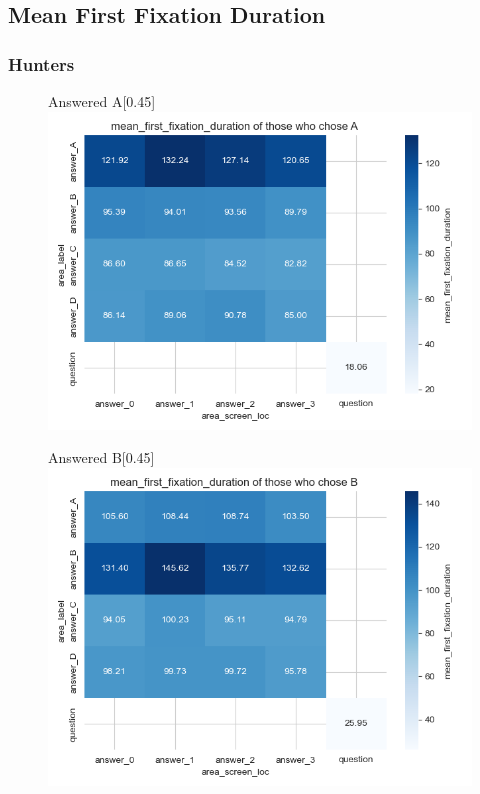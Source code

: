 \documentclass{article}
\begin{document}
\subsection{Mean First Fixation Duration}
\subsubsection{Hunters}

\begin{figure}[H]
  \centering
  \begin{subcaptionbox}{Answered A\label{fig:A_ff_h}}[0.45\textwidth]
    {\centering\includegraphics[width=\linewidth]{plots/matrix_plots/matrix_mean_first_fixation_duration_A_hunters.png}}
  \end{subcaptionbox}
  \hfill
  \begin{subcaptionbox}{Answered B\label{fig:B_ff_h}}[0.45\textwidth]
    {\centering\includegraphics[width=\linewidth]{plots/matrix_plots/matrix_mean_first_fixation_duration_B_hunters.png}}
  \end{subcaptionbox}
  

\end{figure}
\end{document}
